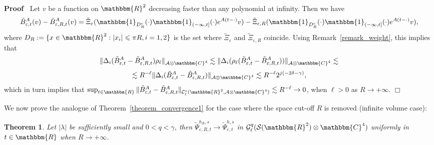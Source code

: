 \documentclass[11pt]{article}
\newcommand{\assign}{:=}
\newenvironment{proof}{\noindent\textbf{Proof\ }}{\hspace*{\fill}$\Box$\medskip}
\newtheorem{theorem}{Theorem}
\begin{document}
\begin{proof}
  Let $v$ be a function on $\mathbbm{R}^2$ decreasing faster than any
  polynomial at infinity. Then we have
  \[ \tilde{B}_{\varepsilon, t}^A (v) - \tilde{B}^A_{\varepsilon, R, t} (v) =
     \tilde{\Xi}_{\varepsilon} (\mathbbm{1}_{D_R^c} (\cdot) \mathbbm{1}_{(-
     \infty, t]} (\cdot) e^{A (t - \cdot)} v) - \tilde{\Xi}_{\varepsilon, R}
     (\mathbbm{1}_{D_R^c} (\cdot) \mathbbm{1}_{(- \infty, t]} (\cdot) e^{A (t -
     \cdot)} v), \]
  where $D_R \assign \{ x \in \mathbbm{R}^2 : | x_i | \leqslant \pi R, i = 1, 2
  \}$ is the set where $\tilde{\Xi}_{\varepsilon}$ and
  $\tilde{\Xi}_{\varepsilon, R}$ coincide. Using Remark~\ref{remark_weight},
  this implies that
  \[ \| \Delta_i (\tilde{B}_{\varepsilon, t}^A - \tilde{B}^A_{\varepsilon, R,
     t}) \rho_{\ell} \|_{\mathcal{A} \otimes \mathbbm{C}^4} \lesssim \|
     \Delta_i (\rho_{\ell} (\tilde{B}_{\varepsilon, t}^A -
     \tilde{B}^A_{\varepsilon, R, t})) \|_{\mathcal{A} \otimes \mathbbm{C}^4}
     \lesssim \]
  \[ \lesssim R^{- \ell} \| \Delta_i (\tilde{B}_{\varepsilon, t}^A -
     \tilde{B}^A_{\varepsilon, R, t}) \|_{\mathcal{A} \otimes \mathbbm{C}^4}
     \lesssim R^{- \ell} 2^{j (- 2 \delta - \gamma)}, \]
  which in turn implies that $\sup_{t \in \mathbbm{R}} \|
  \tilde{B}_{\varepsilon, t}^A - \tilde{B}^A_{\varepsilon, R, t}
  \|_{\mathcal{C}^s_{\ell} (\mathbbm{R}^2, \mathcal{A} \otimes \mathbbm{C}^4)}
  \lesssim R^{- \ell} \rightarrow 0$, when $\ell > 0$ as $R \rightarrow +
  \infty$.
\end{proof}

We now prove the analogue of Theorem~\ref{theorem_convergence1} for the case
where the space cut-off $R$ is removed (infinite volume case):

\begin{theorem}
  \label{theorem_torusplane}Let $| \lambda |$ be sufficiently small and $0 < q
  < \gamma$, then $\tilde{\Psi}_{\varepsilon, R, t}^{h_R, s} \rightarrow
  \tilde{\Psi}_{\varepsilon, t}^{h, s}$ in $\mathcal{G}^q_{\ell} (\mathcal{S}
  (\mathbbm{R}^2) \otimes \mathbbm{C}^4)$ uniformly in $t \in \mathbbm{R}$ when
  $R \rightarrow + \infty$.
\end{theorem}
\end{document}
